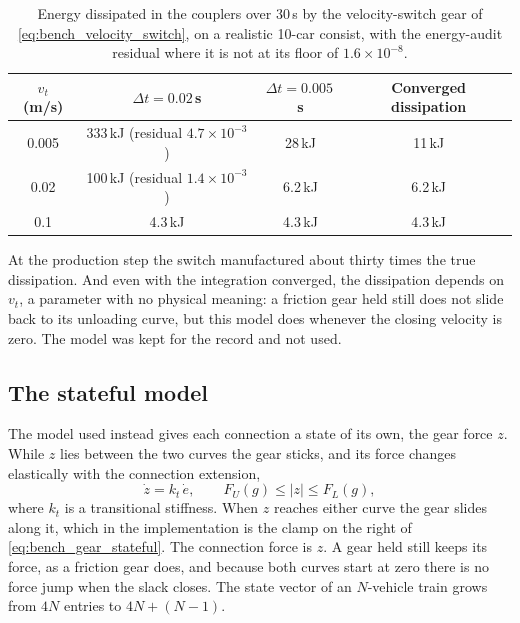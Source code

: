 \begin{table}[htbp]
    \centering
    \small
    \begin{tabular}{cccc}
        \toprule
        $v_t$ (m/s) & $\Delta t = 0.02$\,s & $\Delta t = 0.005$\,s & Converged dissipation \\
        \midrule
        0.005 & 333\,kJ (residual $4.7\times10^{-3}$) & 28\,kJ & 11\,kJ \\
        0.02  & 100\,kJ (residual $1.4\times10^{-3}$) & 6.2\,kJ & 6.2\,kJ \\
        0.1   & 4.3\,kJ & 4.3\,kJ & 4.3\,kJ \\
        \bottomrule
    \end{tabular}
    \caption{Energy dissipated in the couplers over 30\,s by the velocity-switch gear of \cref{eq:bench_velocity_switch}, on a realistic 10-car consist, with the energy-audit residual where it is not at its floor of $1.6\times10^{-8}$.}
    \label{tab:bench_switch_energy}
\end{table}

At the production step the switch manufactured about thirty times the true dissipation. And even with the integration converged, the dissipation depends on $v_t$, a parameter with no physical meaning: a friction gear held still does not slide back to its unloading curve, but this model does whenever the closing velocity is zero. The model was kept for the record and not used.

\subsection{The stateful model}
\label{sec:bench_gear_stateful}

The model used instead gives each connection a state of its own, the gear force $z$. While $z$ lies between the two curves the gear sticks, and its force changes elastically with the connection extension,
\begin{equation}
    \dot z = k_t\,\dot e,
    \qquad
    F_U(g) \le |z| \le F_L(g),
    \label{eq:bench_gear_stateful}
\end{equation}
where $k_t$ is a transitional stiffness. When $z$ reaches either curve the gear slides along it, which in the implementation is the clamp on the right of \cref{eq:bench_gear_stateful}. The connection force is $z$. A gear held still keeps its force, as a friction gear does, and because both curves start at zero there is no force jump when the slack closes. The state vector of an $N$-vehicle train grows from $4N$ entries to $4N + (N - 1)$.

